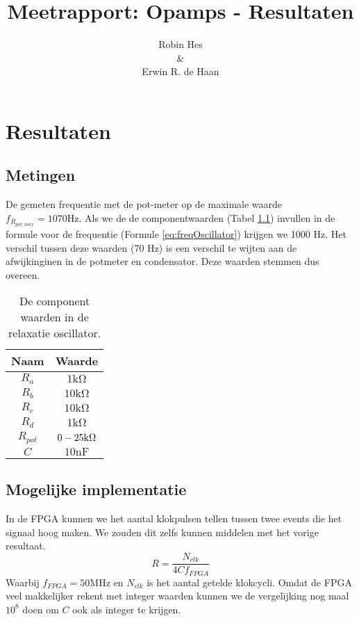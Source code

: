 \documentclass{report}
\title{Meetrapport: Opamps - Resultaten}
\author{Robin Hes\\\&\\Erwin R. de Haan}
\begin{document}
\chapter{Resultaten}
\section{Metingen}
De gemeten frequentie met de pot-meter op de maximale waarde $f_{R_{pot,max}} = 1070 \mathrm{Hz}$. Als we de de componentwaarden (Tabel \ref{tab:components}) invullen in de formule voor de frequentie (Formule \ref{eq:freqOscillator}) krijgen we 1000 Hz. Het verschil tussen deze waarden (70 Hz) is een verschil te wijten aan de afwijkinginen in de potmeter en condensator. Deze waarden stemmen dus overeen.
\begin{table}[H]
\caption{De component waarden in de relaxatie oscillator.}
\label{tab:components}
\centering
\begin{tabular}{|c|c|}
\hline
Naam & Waarde\\
\hline
$R_a$ & $1 \mathrm{k\Omega}$\\
\hline
$R_b$ & $10 \mathrm{k\Omega}$\\
\hline
$R_c$ & $10 \mathrm{k\Omega}$\\
\hline
$R_d$ & $1 \mathrm{k\Omega}$\\
\hline
$R_{pot}$ & $0\--25 \mathrm{k\Omega}$\\
\hline
$C$ & $10 \mathrm{nF}$\\
\hline
\end{tabular}
\end{table}
\section{Mogelijke implementatie}
In de FPGA kunnen we het aantal klokpulsen tellen tussen twee events die het signaal hoog maken. We zouden dit zelfs kunnen middelen met het vorige resultaat.
\begin{equation}
\label{eq:fpgaEq}
R = \frac{N_{clk}}{4Cf_{FPGA}}
\end{equation}
Waarbij $f_{FPGA} = 50 \mathrm{MHz}$ en $N_{clk}$ is het aantal getelde klokcycli. Omdat de FPGA veel makkelijker rekent met integer waarden kunnen we de vergelijking nog maal $10^8$ doen om $C$ ook als integer te krijgen.
\end{document}
